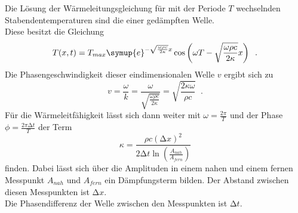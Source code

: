 \noindent Die Lösung der Wärmeleitungsgleichung für mit der Periode $T$ wechselnden Stabendentemperaturen sind die einer gedämpften Welle.\\
Diese besitzt die Gleichung
\begin{equation*}
    T(x,t)=T_{max} \symup{e}^{-\sqrt{\frac{\omega \rho c}{2 \kappa}}x} \cos\left( \omega T- \sqrt{\frac{\omega \rho c}{2 \kappa}} x \right) \; \; .
\end{equation*}
Die Phasengeschwindigkeit dieser eindimensionalen Welle $v$ ergibt sich zu
\begin{equation*}
    v= \frac{\omega}{k}= \frac{\omega}{\sqrt{\frac{\omega \rho c}{2 \kappa}}}=\sqrt{\frac{2 \kappa \omega}{\rho c}} \; \; . 
\end{equation*}
Für die Wärmeleitfähigkeit lässt sich dann weiter mit $\omega = \frac{2 \pi}{T}$ und der Phase $\phi=\frac{2 \pi \increment t}{T}$ der Term 
\begin{equation*} 
    \kappa =\frac{\rho c(\increment x)^2}{2 \increment t \ln{\left(\frac{A_{nah}}{A_{fern}}\right)}}
\end{equation*}
finden. Dabei lässt sich über die Amplituden in einem nahen und einem fernen Messpunkt $A_{nah}$ und $A_{fern}$ ein Dämpfungsterm bilden.
Der Abstand zwischen diesen Messpunkten ist $\increment x$.\\
Die Phasendifferenz der Welle zwischen den Messpunkten ist $\increment t$.